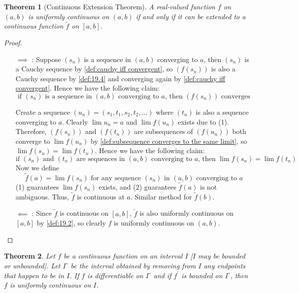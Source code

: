 \documentclass[12pt, lettersize]{book}
\theoremstyle{plain}
\newtheorem{thm}{Theorem}[section]
\theoremstyle{definition}
\theoremstyle{remark}
\begin{document}
			\setcounter{equation}{0}
			\begin{thm}[Continuous Extension Theorem]\label{def:19.5}
			A real-valued function $f$ on $(a,b)$ is uniformly continuous on $(a,b)$ if and only if it can be extended to
			a continuous function $\tilde{f}$ on $[a,b]$.
			\end{thm}
			\begin{proof}
			\begin{itemize}
				\item[]
				\item[$\implies$]: Suppose $(s_n)$ is a sequence in $(a,b)$ converging to $a$, then $(s_n)$ is a Cauchy
				sequence by \ref{def:cauchy iff convergent}, so $(f(s_n))$ is also a Cauchy sequence by \ref{def:19.4} and 
				converging again by \ref{def:cauchy iff convergent}. Hence we have the following claim:
				\begin{equation}
					\text{if $(s_n)$ is a sequence in $(a,b)$ converging to $a$, then $(f(s_n))$ converges}
				\end{equation}
			
				Create a sequence $(u_n)=(s_1, t_1,s_2,t_2,\dots)$ where $(t_n)$ is also a sequence converging to $a$.
				Clearly $\lim u_n=a$ and $\lim f(u_n)$ exists due to (1). Therefore, $(f(s_n))$ and $(f(t_n))$ are 
				subsequences of $(f(u_n))$ both converge to $\lim f(u_n)$ by \ref{def:subsequence converges to the same limit}, so $\lim f(s_n)=\lim f(t_n)$. Hence we have the following claim:
				\begin{equation}
					\text{if $(s_n)$ and $(t_n)$ are sequences in $(a,b)$ converging to $a$, then $\lim f(s_n)=\lim f(t_n)$}
				\end{equation}
				Now we define
				\begin{equation}
					\text{$\tilde{f}(a)=\lim f(s_n)$ for any sequence $(s_n)$ in $(a,b)$ converging to $a$}
				\end{equation}
				(1) guarantees $\lim f(s_n)$ exists, and (2) guarantees $\tilde{f}(a)$ is not ambiguous. Thus, $\tilde{f}$
				is continuous at $a$. Similar method for $\tilde{f}(b)$.
				\item[$\impliedby$]: Since $\tilde{f}$ is continuous on $[a,b]$, $\tilde{f}$ is also uniformly continuous
				on $[a,b]$ by \ref{def:19.2}, so clearly $f$ is uniformly continuous on $(a,b)$.
			\end{itemize}
			\end{proof}
			
			\begin{thm}
			Let $f$ be a continuous function on an interval $I$ [$I$ may be bounded or unbounded]. Let $I^\circ$ be the
			interval obtained by removing from $I$ any endpoints that happen to be in $I$. If $f$ is differentiable on
			$I^\circ$ and if $f^\prime$ is bounded on $I^\circ$, then $f$ is uniformly continuous on $I$.
			\end{thm}
			\newpage
		
\end{document}
